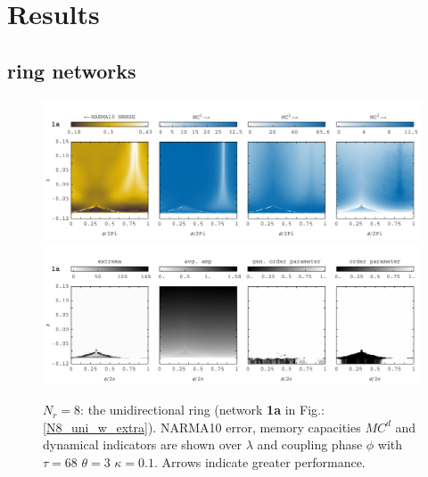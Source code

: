 \section{Results}

	\subsection{ring networks}

\begin{figure}\label{fig:N8_uni_ring_dynamics_capacities}
	\centering
	\includegraphics[width=15cm]{pics/N8/basics/N8_1a_uni_th3_tau68_vN16_capacities}
	\includegraphics[width=15cm]{pics/N8/basics/N8_1a_uni_theta3_tau68_dyn}
	\caption{$N_r=8$: the unidirectional ring (network \textbf{1a} in Fig.:\ref{N8_uni_w_extra}). NARMA10 error, memory capacities $MC^{d}$ and dynamical indicators are shown over $\lambda$ and coupling phase $\phi$ with $\tau=68$ $\theta=3$ $\kappa=0.1$. Arrows indicate greater performance.}
\end{figure}


